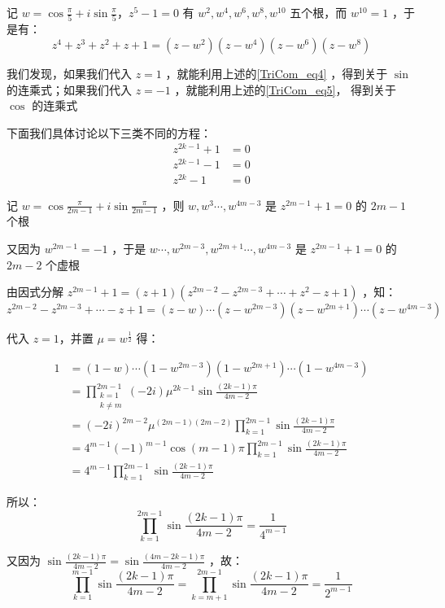 记 $\displaystyle{w=\cos\frac{\pi}5+i\sin\frac{\pi}5}$，$z^5-1=0$ 有 $w^2,w^4,w^6,w^8,w^{10}$ 五个根，而 $w^{10}=1$ ，于是有：
$$z^4+z^3+z^2+z+1=(z-w^2)(z-w^4)(z-w^6)(z-w^8)$$

我们发现，如果我们代入 $z=1$ ，就能利用上述的\autoref{TriCom_eq4}  ，得到关于 $\sin$ 的连乘式；如果我们代入 $z=-1$ ，就能利用上述的\autoref{TriCom_eq5}， 得到关于 $\cos$ 的连乘式

下面我们具体讨论以下三类不同的方程：
$$\begin{aligned}
z^{2k-1}+1&=0\\z^{2k-1}-1&=0 \\z^{2k}-1&=0
\end{aligned}$$

记 $\displaystyle{w=\cos\frac{\pi}{2m-1}+i\sin\frac{\pi}{2m-1}}$ ，则 $w,w^3\cdots,w^{4m-3}$ 是 $z^{2m-1}+1=0$ 的 $2m-1$ 个根

又因为 $w^{2m-1}=-1$ ，于是 $w\cdots ,w^{2m-3},w^{2m+1}\cdots ,w^{4m-3}$ 是 $z^{2m-1}+1=0$ 的 $2m-2$ 个虚根

由因式分解 $z^{2m-1}+1=(z+1)(z^{2m-2}-z^{2m-3}+\cdots+z^{2}-z+1)$ ，知：
$$z^{2m-2}-z^{2m-3}+\cdots-z+1=(z-w)\cdots(z-w^{2m-3})(z-w^{2m+1})\cdots(z-w^{4m-3})$$

代入 $z=1$，并置 $\mu=w^{\frac12}$ 得：

$$\begin{aligned}
1&=(1-w)\cdots(1-w^{2m-3})(1-w^{2m+1})\cdots(1-w^{4m-3})\\&=\prod_{\substack{k=1\\k\neq m}}^{2m-1}(-2i)\mu^{2k-1}\sin\frac{(2k-1)\pi}{4m-2}\\&=(-2i)^{2m-2}{\mu}^{(2m-1)(2m-2)}\prod_{k=1}^{2m-1}\sin{\frac{(2k-1)\pi}{4m-2}}\\ &=4^{m-1}(-1)^{m-1}\cos(m-1)\pi\prod_{k=1}^{2m-1}\sin{\frac{(2k-1)\pi}{4m-2}}\\ &=4^{m-1}\prod_{k=1}^{2m-1}\sin{\frac{(2k-1)\pi}{4m-2}}  
\end{aligned}$$

所以： 
\begin{equation}%
\prod_{k=1}^{2m-1}\sin{\frac{(2k-1)\pi}{4m-2}}=\frac{1}{4^{m-1}}
\end{equation}

又因为 $\displaystyle{\sin\frac{(2k-1)\pi}{4m-2}=\sin\frac{(4m-2k-1)\pi}{4m-2}}$ ，故：
\begin{equation}%
\prod_{k=1}^{m-1}\sin{\frac{(2k-1)\pi}{4m-2}}=\prod_{k=m+1}^{2m-1}\sin{\frac{(2k-1)\pi}{4m-2}}=\frac{1}{2^{m-1}}
\end{equation}

